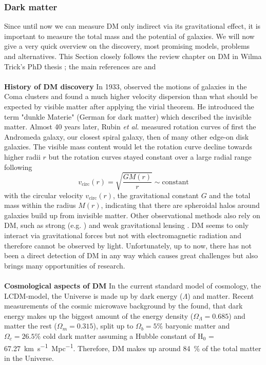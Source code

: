 \subsubsection{Dark matter}
Since until now we can measure \ac{DM} only indirect via its gravitational effect, it is important to measure the total mass and the potential of galaxies. We will now give a very quick overview on the discovery, most promising models, problems and alternatives. This Section closely follows the review chapter on \ac{DM} in Wilma Trick's PhD thesis \citep{Wilmathesis}; the main references are \citet{Ostriker...DM...2003, Maoz...astrophysics...2007} and \citet{Mo...galformev...2010} \\
\\\textbf{History of \ac{DM} discovery} In 1933, \citeauthor{Zwicky...DM...1933} observed the motions of galaxies in the Coma clusters and found a much higher velocity dispersion than what should be expected by visible matter after applying the virial theorem. He introduced the term "dunkle Materie" (German for dark matter) which described the invisible matter. Almost 40 years later, Rubin \textit{et al.} \citeyearpar{Rubin...DM...1970, Rubin...DM...1978, Rubin...DM...1980} measured rotation curves of first the Andromeda galaxy, our closest spiral galaxy, then of many other edge-on disk galaxies. The visible mass content would let the rotation curve decline towards higher radii $r$ but the rotation curves stayed constant over a large radial range following 
\begin{equation}\label{eq:circ_vel}
    v_{\mathrm{circ}}(r) = \sqrt{\frac{GM(r)}{r}} \sim \mathrm{constant}
\end{equation}
with the circular velocity $v_\mathrm{{circ}}(r)$, the gravitational constant $G$ and the total mass within the radius $M(r)$, indicating that there are spheroidal halos around galaxies build up from invisible matter. Other observational methods also rely on \ac{DM}, such as strong (e.g. \cite{Trick..stronglensing...2016}) and weak gravitational lensing \citep{Tyson...weaklensing...1990, Kaiser...weaklensing...1993}. \ac{DM} seems to only interact via gravitational forces but not with electromagnetic radiation and therefore cannot be observed by light. Unfortunately, up to now, there has not been a direct detection of \ac{DM} in any way which causes great challenges but also brings many opportunities of research.\\
\\\textbf{Cosmological aspects of \ac{DM}}
In the current standard model of cosmology, the \ac{LCDM}-model, the Universe is made up by dark energy ($\Lambda$) and matter. Recent measurements of the cosmic microwave background by the \citet{Planck...CMB...2018} found, that dark energy makes up the biggest amount of the energy density ($\Omega_\Lambda = 0.685$) and matter the rest ($\Omega_m = 0.315$), split up to $\Omega_b = 5\%$ baryonic matter and $\Omega_c = 26.5\%$ cold dark matter assuming a Hubble constant of H$_0$ =  \SI{67.27}{km.s^{-1}.Mpc^{-1}}. Therefore, \ac{DM} makes up around \SI{84}{\%} of the total matter in the Universe. \\
